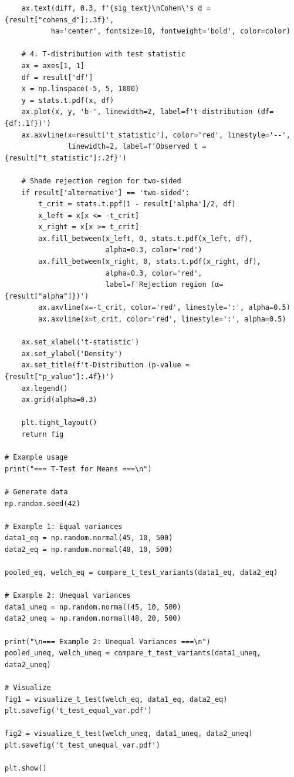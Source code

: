 \begin{lstlisting}
    ax.text(diff, 0.3, f'{sig_text}\nCohen\'s d = {result["cohens_d"]:.3f}',
           ha='center', fontsize=10, fontweight='bold', color=color)

    # 4. T-distribution with test statistic
    ax = axes[1, 1]
    df = result['df']
    x = np.linspace(-5, 5, 1000)
    y = stats.t.pdf(x, df)
    ax.plot(x, y, 'b-', linewidth=2, label=f't-distribution (df={df:.1f})')
    ax.axvline(x=result['t_statistic'], color='red', linestyle='--',
               linewidth=2, label=f'Observed t = {result["t_statistic"]:.2f}')

    # Shade rejection region for two-sided
    if result['alternative'] == 'two-sided':
        t_crit = stats.t.ppf(1 - result['alpha']/2, df)
        x_left = x[x <= -t_crit]
        x_right = x[x >= t_crit]
        ax.fill_between(x_left, 0, stats.t.pdf(x_left, df),
                        alpha=0.3, color='red')
        ax.fill_between(x_right, 0, stats.t.pdf(x_right, df),
                        alpha=0.3, color='red',
                        label=f'Rejection region (α={result["alpha"]})')
        ax.axvline(x=-t_crit, color='red', linestyle=':', alpha=0.5)
        ax.axvline(x=t_crit, color='red', linestyle=':', alpha=0.5)

    ax.set_xlabel('t-statistic')
    ax.set_ylabel('Density')
    ax.set_title(f't-Distribution (p-value = {result["p_value"]:.4f})')
    ax.legend()
    ax.grid(alpha=0.3)

    plt.tight_layout()
    return fig

# Example usage
print("=== T-Test for Means ===\n")

# Generate data
np.random.seed(42)

# Example 1: Equal variances
data1_eq = np.random.normal(45, 10, 500)
data2_eq = np.random.normal(48, 10, 500)

pooled_eq, welch_eq = compare_t_test_variants(data1_eq, data2_eq)

# Example 2: Unequal variances
data1_uneq = np.random.normal(45, 10, 500)
data2_uneq = np.random.normal(48, 20, 500)

print("\n=== Example 2: Unequal Variances ===\n")
pooled_uneq, welch_uneq = compare_t_test_variants(data1_uneq, data2_uneq)

# Visualize
fig1 = visualize_t_test(welch_eq, data1_eq, data2_eq)
plt.savefig('t_test_equal_var.pdf')

fig2 = visualize_t_test(welch_uneq, data1_uneq, data2_uneq)
plt.savefig('t_test_unequal_var.pdf')

plt.show()
\end{lstlisting}

